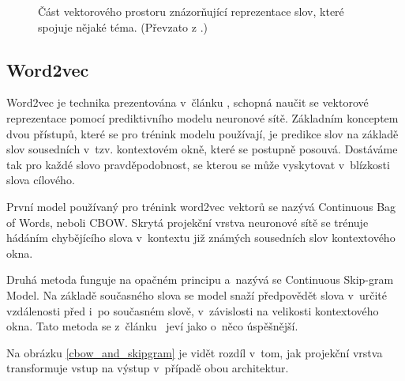 \begin{figure}[hbt]
	\centering
	\caption{Část vektorového prostoru znázorňující reprezentace slov, které spojuje nějaké téma. (Převzato z \cite{online:word_embedds}.)}
	\label{word_embeddings}
\end{figure}

\subsection{Word2vec}

Word2vec je technika prezentována v~článku \cite{mikolov2013embeddings}, schopná naučit se vektorové reprezentace pomocí prediktivního modelu neuronové sítě. Základním konceptem dvou přístupů, které se pro trénink modelu používají, je predikce slov na základě slov sousedních v~tzv. kontextovém okně, které se postupně posouvá. Dostáváme tak pro každé slovo pravděpodobnost, se kterou se může vyskytovat v~blízkosti slova cílového.\par
První model používaný pro trénink word2vec vektorů se nazývá Continuous Bag of Words, neboli CBOW. Skrytá projekční vrstva neuronové sítě se trénuje hádáním chybějícího slova v~kontextu již známých sousedních slov kontextového okna.\par
Druhá metoda funguje na opačném principu a~nazývá se Continuous Skip-gram Model. Na základě současného slova se model snaží předpovědět slova v~určité vzdálenosti před i~po současném slově, v~závislosti na velikosti kontextového okna. Tato metoda se z~článku~\cite{mikolov2013embeddings} jeví jako o~něco úspěšnější.\par
Na obrázku \ref{cbow_and_skipgram} je vidět rozdíl v~tom, jak projekční vrstva transformuje vstup na výstup v~případě obou architektur.

